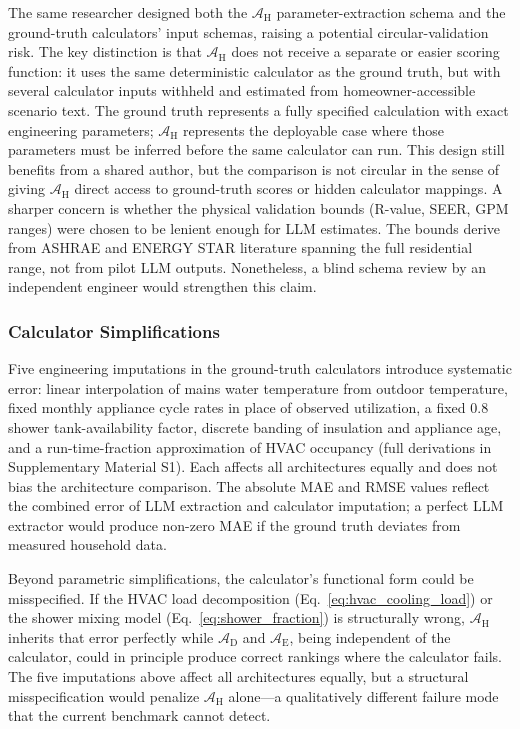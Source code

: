 \documentclass[a4paper,fleqn]{cas-dc}
\begin{document}
The same researcher designed both the $\mathcal{A}_{\text{H}}$ parameter-extraction schema and the ground-truth calculators' input schemas, raising a potential circular-validation risk. The key distinction is that $\mathcal{A}_{\text{H}}$ does not receive a separate or easier scoring function: it uses the same deterministic calculator as the ground truth, but with several calculator inputs withheld and estimated from homeowner-accessible scenario text. The ground truth represents a fully specified calculation with exact engineering parameters; $\mathcal{A}_{\text{H}}$ represents the deployable case where those parameters must be inferred before the same calculator can run. This design still benefits from a shared author, but the comparison is not circular in the sense of giving $\mathcal{A}_{\text{H}}$ direct access to ground-truth scores or hidden calculator mappings. A sharper concern is whether the physical validation bounds (R-value, SEER, GPM ranges) were chosen to be lenient enough for LLM estimates. The bounds derive from ASHRAE and ENERGY STAR literature spanning the full residential range, not from pilot LLM outputs. Nonetheless, a blind schema review by an independent engineer would strengthen this claim.

\subsubsection{Calculator Simplifications}
\label{sec:calculator-simplifications}

Five engineering imputations in the ground-truth calculators introduce systematic error: linear interpolation of mains water temperature from outdoor temperature, fixed monthly appliance cycle rates in place of observed utilization, a fixed 0.8 shower tank-availability factor, discrete banding of insulation and appliance age, and a run-time-fraction approximation of HVAC occupancy (full derivations in Supplementary Material S1). Each affects all architectures equally and does not bias the architecture comparison. The absolute MAE and RMSE values reflect the combined error of LLM extraction and calculator imputation; a perfect LLM extractor would produce non-zero MAE if the ground truth deviates from measured household data.

Beyond parametric simplifications, the calculator's functional form could be misspecified. If the HVAC load decomposition (Eq.~\ref{eq:hvac_cooling_load}) or the shower mixing model (Eq.~\ref{eq:shower_fraction}) is structurally wrong, $\mathcal{A}_{\text{H}}$ inherits that error perfectly while $\mathcal{A}_{\text{D}}$ and $\mathcal{A}_{\text{E}}$, being independent of the calculator, could in principle produce correct rankings where the calculator fails. The five imputations above affect all architectures equally, but a structural misspecification would penalize $\mathcal{A}_{\text{H}}$ alone---a qualitatively different failure mode that the current benchmark cannot detect.
\end{document}
